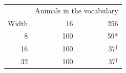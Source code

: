 \begin{tabular}{@{}rrr@{}}
\toprule
 & \multicolumn{2}{c}{Animals in the vocabulary} \\
Width & 16 & 256 \\
\midrule
8 & 100 & 59* \\
16 & 100 & 37$^{\dagger}$ \\
32 & 100 & 37$^{\dagger}$ \\
\bottomrule
\end{tabular}
